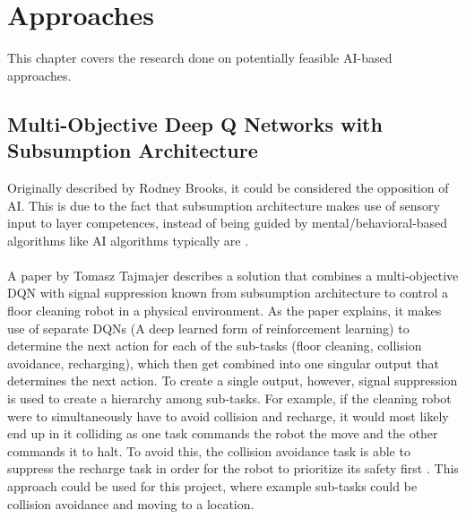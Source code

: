 \chapter{Approaches}
\label{ch:approaches}
This chapter covers the research done on potentially feasible \gls{AI}-based approaches.

\section{Multi-Objective Deep Q Networks with Subsumption Architecture}
Originally described by Rodney Brooks, it could be considered the opposition of \gls{AI}. This is due to the fact that subsumption architecture makes use of sensory input to layer competences, instead of being guided by mental/behavioral-based algorithms like \gls{AI} algorithms typically are \citep{subsumption_architecture}.
\\\\
A paper by Tomasz Tajmajer describes a solution that combines a multi-objective \gls{DQN} with signal suppression known from subsumption architecture to control a floor cleaning robot in a physical environment. As the paper explains, it makes use of separate \gls{DQN}s (A deep learned form of reinforcement learning) to determine the next action for each of the sub-tasks (floor cleaning, collision avoidance, recharging), which then get combined into one singular output that determines the next action. To create a single output, however, signal suppression is used to create a hierarchy among sub-tasks. For example, if the cleaning robot were to simultaneously have to avoid collision and recharge, it would most likely end up in it colliding as one task commands the robot the move and the other commands it to halt. To avoid this, the collision avoidance task is able to suppress the recharge task in order for the robot to prioritize its safety first \citep{mdqns}. This approach could be used for this project, where example sub-tasks could be collision avoidance and moving to a location.

